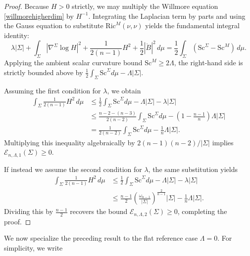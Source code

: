 \documentclass[12pt,a4paper]{amsart}
\theoremstyle{plain}
\theoremstyle{definition}
\begin{document}
\begin{proof}
Because $H > 0$ strictly, we may multiply the Willmore equation \eqref{willmorehigherdim} by $H^{-1}$. Integrating the Laplacian term by parts and using the Gauss equation to substitute $\mathrm{Ric}^M(\nu, \nu)$ yields the fundamental integral identity:
\begin{equation}\label{willmoredived_unified}
\lambda |\Sigma | + \int_{\Sigma} |\nabla^{\Sigma} \log H|^2 + \frac{1}{2(n-1)} H^2 + \frac{1}{2} |\mathring{B}|^2 \, d\mu = \frac{1}{2} \int_{\Sigma } (\mathrm{Sc}^{\Sigma} - \mathrm{Sc}^M) \, d\mu.
\end{equation}
Applying the ambient scalar curvature bound $\mathrm{Sc}^M \ge 2\Lambda$, the right-hand side is strictly bounded above by $\frac{1}{2} \int_{\Sigma } \mathrm{Sc}^{\Sigma} d\mu - \Lambda|\Sigma|$. 

Assuming the first condition  for $\lambda$, we obtain
\begin{equation*}
\begin{split}
    \int_{\Sigma} \frac{1}{2(n-1)} H^2 \, d\mu &\leq \frac{1}{2} \int_{\Sigma} \mathrm{Sc}^{\Sigma} d\mu - \Lambda|\Sigma| - \lambda|\Sigma| \\
    &\leq \frac{n-2 - (n-3)}{2(n-2)} \int_{\Sigma} \mathrm{Sc}^{\Sigma} d\mu - \left(1 - \frac{n-1}{n}\right)\Lambda|\Sigma| \\
    &= \frac{1}{2(n-2)} \int_{\Sigma} \mathrm{Sc}^{\Sigma} d\mu - \frac{1}{n}\Lambda|\Sigma|.
\end{split}
\end{equation*}
Multiplying this inequality algebraically by $2(n-1)(n-2)/|\Sigma|$  implies $\mathcal{E}_{n,\Lambda,1}(\Sigma)\geq 0$.

If instead we assume the second condition  for $\lambda$, the same substitution yields
\begin{equation*}
\begin{split}
    \int_{\Sigma} \frac{1}{2(n-1)} H^2 \, d\mu &\leq \frac{1}{2} \int_{\Sigma} \mathrm{Sc}^{\Sigma} d\mu - \Lambda|\Sigma| - \lambda|\Sigma| \\
    &\leq \frac{n-1}{2} \left( \frac{\omega_{n-1}}{ |\Sigma|} \right)^{\frac{2}{n-1}}|\Sigma| - \frac{1}{n}\Lambda|\Sigma|.
\end{split}
\end{equation*}
Dividing this by $\frac{n-1}{2}$  recovers the bound $\mathcal{E}_{n,\Lambda,2}(\Sigma)\geq 0$, completing the proof.
\end{proof}
We now specialize the preceding result to the flat reference case \(\Lambda=0\). For simplicity, we write
\end{document}
